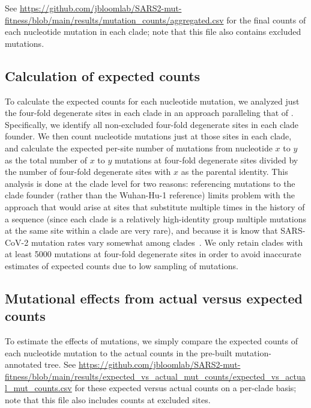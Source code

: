 \documentclass[9pt,twocolumn,twoside]{gsajnl_modified}
\begin{document}
{See \url{https://github.com/jbloomlab/SARS2-mut-fitness/blob/main/results/mutation_counts/aggregated.csv} for the final counts of each nucleotide mutation in each clade; note that this file also contains excluded mutations.

\subsection{Calculation of expected counts}
To calculate the expected counts for each nucleotide mutation, we analyzed just the four-fold degenerate sites in each clade in an approach paralleling that of \cite{bloom2022evolution}.
Specifically, we identify all non-excluded four-fold degenerate sites in each clade founder.
We then count nucleotide mutations just at those sites in each clade, and calculate the expected per-site number of mutations from nucleotide $x$ to $y$ as the total number of $x$ to $y$ mutations at four-fold degenerate sites divided by the number of four-fold degenerate sites with $x$ as the parental identity.
This analysis is done at the clade level for two reasons: referencing mutations to the clade founder (rather than the Wuhan-Hu-1 reference) limits problem with the approach that would arise at sites that substitute multiple times in the history of a sequence (since each clade is a relatively high-identity group multiple mutations at the same site within a clade are very rare), and because it is know that SARS-CoV-2 mutation rates vary somewhat among clades~\citep{bloom2022evolution,ruis2022mutational}.
We only retain clades with at least 5000 mutations at four-fold degenerate sites in order to avoid inaccurate estimates of expected counts due to low sampling of mutations.

\subsection{Mutational effects from actual versus expected counts}
To estimate the effects of mutations, we simply compare the expected counts of each nucleotide mutation to the actual counts in the pre-built mutation-annotated tree.
See \url{https://github.com/jbloomlab/SARS2-mut-fitness/blob/main/results/expected_vs_actual_mut_counts/expected_vs_actual_mut_counts.csv} for these expected versus actual counts on a per-clade basis; note that this file also includes counts at excluded sites.

}
\end{document}
